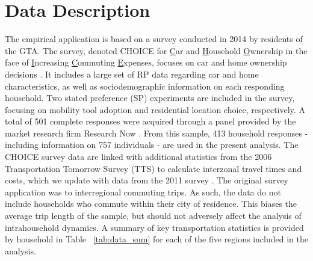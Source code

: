 \section{Data Description}
The empirical application is based on a survey conducted in 2014 by residents of the GTA. The survey, denoted CHOICE for \underline{C}ar and \underline{H}ousehold \underline{O}wnership in the face of \underline{I}ncreasing \underline{C}ommuting \underline{E}xpenses, focuses on car and home ownership decisions \cite{Papaioannou2014}. It includes a large set of RP data regarding car and home characteristics, as well as sociodemographic information on each responding household. Two stated preference (SP) experiments are included in the survey, focusing on mobility tool adoption and residential location choice, respectively. A total of 501 complete responses were acquired through a panel provided by the market research firm Research Now \cite{Papaioannou2014}. From this sample, 413 household responses - including information on 757 individuals - are used in the present analysis. The CHOICE survey data are linked with additional statistics from the 2006 Transportation Tomorrow Survey (TTS) to calculate interzonal travel times and costs, which we update with data from the 2011 survey \cite{Papaioannou2014,DataManagementGroup2014}. The original survey application was to interregional commuting trips. As such, the data do not include households who commute within their city of residence. This biases the average trip length of the sample, but should not adversely affect the analysis of intrahousehold dynamics. A summary of key transportation statistics is provided by household in Table ~\ref{tab:data_sum} for each of the five regions included in the analysis.

